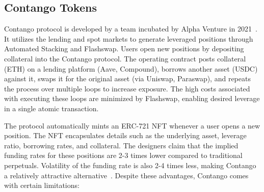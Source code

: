 \subsection{Contango Tokens}\label{subsec:contango}
Contango protocol is developed by a team incubated by Alpha Venture in 2021~\cite{Contango_Blog}. It utilizes the lending and spot markets to generate leveraged positions through Automated Stacking and Flashswap. Users open new positions by depositing collateral into the Contango protocol. The operating contract posts collateral (ETH) on a lending platform (Aave, Compound), borrows another asset (USDC) against it, swaps it for the original asset (via Uniswap, Paraswap), and repeats the process over multiple loops to increase exposure. The high costs associated with executing these loops are minimized by Flashswap, enabling desired leverage in a single atomic transaction.

The protocol automatically mints an ERC-721 NFT whenever a user opens a new position. The NFT encapsulates details such as the underlying asset, leverage ratio, borrowing rates, and collateral. The designers claim that the implied funding rates for these positions are 2-3 times lower compared to traditional perpetuals. Volatility of the funding rate is also 2-4 times less,  making Contango a relatively attractive alternative~\cite{Contango_Doc,Contango_Medium}. Despite these advantages, Contango comes with certain limitations:

